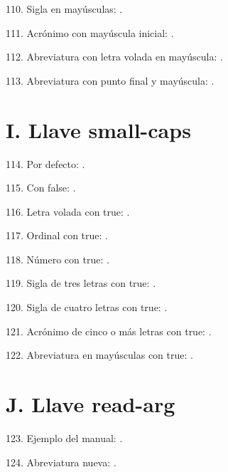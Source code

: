 \documentclass{article}
\begin{document}
110. Sigla en mayúsculas: .

111. Acrónimo con mayúscula inicial: .

112. Abreviatura con letra volada en mayúscula: .

113. Abreviatura con punto final y mayúscula: .

\section*{I. Llave small-caps}

114. Por defecto: .

115. Con false: .

116. Letra volada con true: .

117. Ordinal con true: .

118. Número con true: .

119. Sigla de tres letras con true: .

120. Sigla de cuatro letras con true: .

121. Acrónimo de cinco o más letras con true: .

122. Abreviatura en mayúsculas con true: .

\section*{J. Llave read-arg}

123. Ejemplo del manual: .

124. Abreviatura nueva: .
\end{document}
